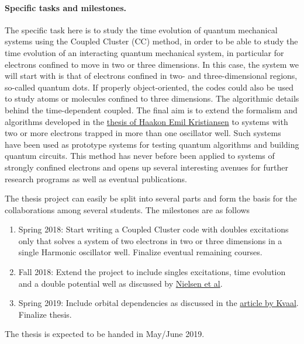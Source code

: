 \documentclass[%
oneside,                 %
final,                   %
10pt]{article}
\begin{document}
\paragraph{Specific tasks and milestones.}
The specific task here is to study the time evolution of quantum mechanical systems using the Coupled Cluster (CC) method, in order to be able to study
the time evolution of an interacting quantum mechanical system, in
particular for electrons confined to move in two or three
dimensions. In this case, the system we will start with is that of
electrons confined in two- and three-dimensional regions, so-called quantum dots.
If properly object-oriented, the codes could also be used to study
atoms or molecules confined to three dimensions. The algorithmic
details behind the time-dependent coupled.  The final aim is to extend the
formalism and algorithms developed in the \href{{https://github.com/haakoek/PythonVersionMaster/tree/master/Thesis/Chapters}}{thesis of Haakon Emil Kristiansen}  to systems
with two or more electrons trapped in more than one oscillator
well. Such systems have been used as prototype systems for testing
quantum algorithms and building quantum circuits.  This method has
never before been applied to systems of strongly confined electrons
and opens up several interesting avenues for further research programs
as well as eventual publications.

The thesis project can easily be split into several parts and form the basis for the collaborations among several students. The milestones are as follows
\begin{enumerate}
\item Spring 2018: Start writing a Coupled Cluster code with doubles excitations only that solves a system of two electrons in two or three dimensions in a single Harmonic oscillator well. Finalize eventual remaining courses.

\item Fall 2018: Extend the project to include singles excitations, time evolution and a double potential well as discussed by \href{{https://journals.aps.org/prb/abstract/10.1103/PhysRevB.85.035319}}{Nielsen et al}.

\item Spring 2019: Include orbital dependencies as discussed in the \href{{http://aip.scitation.org/doi/abs/10.1063/1.4718427}}{article by Kvaal}. Finalize thesis. 
\end{enumerate}

\noindent
The thesis is expected to be handed in May/June  2019.
\end{document}
